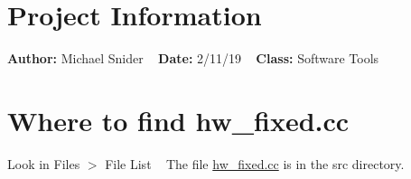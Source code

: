 \hypertarget{index_information}{}\section{Project Information}\label{index_information}
{\bfseries{Author\+:}} Michael Snider ~\newline
{\bfseries{Date\+:}} 2/11/19 ~\newline
{\bfseries{Class\+:}} Software Tools ~\newline
 \hypertarget{index_general}{}\section{Where to find hw\+\_\+fixed.\+cc}\label{index_general}
Look in Files $>$ File List ~\newline
The file \mbox{\hyperlink{hw__fixed_8cc}{hw\+\_\+fixed.\+cc}} is in the src directory. 